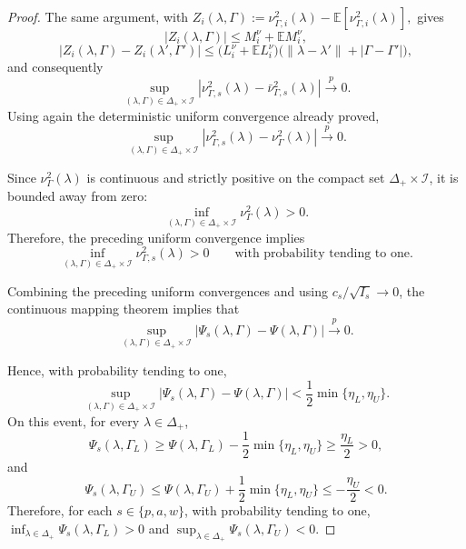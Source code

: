 \documentclass[12pt,leqno,titlepage]{amsart}
\newcommand{\1}{\mathbbm{1}}
\begin{document}
\begin{bibunit}
{\begin{proof}
The same argument, with
$
Z_i(\lambda,\Gamma):=\nu_{\Gamma,i}^2(\lambda)-\mathbb E[\nu_{\Gamma,i}^2(\lambda)],
$
gives
\[
|Z_i(\lambda,\Gamma)|\le M_i^\nu+\mathbb EM_i^\nu,
\]
\[
|Z_i(\lambda,\Gamma)-Z_i(\lambda',\Gamma')|
\le
\bigl(L_i^\nu+\mathbb EL_i^\nu\bigr)\bigl(\|\lambda-\lambda'\|+|\Gamma-\Gamma'|\bigr),
\]
and consequently
\[
\sup_{(\lambda,\Gamma)\in\Delta_+\times\mathcal I}
\left|
\nu_{\Gamma,s}^2(\lambda)-\bar\nu_{\Gamma,s}^2(\lambda)
\right|
\xrightarrow{p}0.
\]
Using again the deterministic uniform convergence already proved,
\[
\sup_{(\lambda,\Gamma)\in\Delta_+\times\mathcal I}
|\nu_{\Gamma,s}^2(\lambda)-\nu_\Gamma^2(\lambda)|
\xrightarrow{p}0.
\]

Since \(\nu_\Gamma^2(\lambda)\) is continuous and strictly positive on the compact set \(\Delta_+\times\mathcal I\), it is bounded away from zero:
\[
\inf_{(\lambda,\Gamma)\in\Delta_+\times\mathcal I}\nu_\Gamma^2(\lambda)>0.
\]
Therefore, the preceding uniform convergence implies
\[
\inf_{(\lambda,\Gamma)\in\Delta_+\times\mathcal I}\nu_{\Gamma,s}^2(\lambda)>0
\qquad\text{with probability tending to one.}
\]

Combining the preceding uniform convergences and using \(c_s/\sqrt{I_s}\to0\), the continuous mapping theorem implies that
\[
\sup_{(\lambda,\Gamma)\in\Delta_+\times\mathcal I}
|\Psi_s(\lambda,\Gamma)-\Psi(\lambda,\Gamma)|
\xrightarrow{p}0.
\]

Hence, with probability tending to one,
\[
\sup_{(\lambda,\Gamma)\in\Delta_+\times\mathcal I}
|\Psi_s(\lambda,\Gamma)-\Psi(\lambda,\Gamma)|
<
\frac12\min\{\eta_L,\eta_U\}.
\]
On this event, for every \(\lambda\in\Delta_+\),
\[
\Psi_s(\lambda,\Gamma_L)
\ge
\Psi(\lambda,\Gamma_L)-\frac12\min\{\eta_L,\eta_U\}
\ge
\frac{\eta_L}{2}>0,
\]
and
\[
\Psi_s(\lambda,\Gamma_U)
\le
\Psi(\lambda,\Gamma_U)+\frac12\min\{\eta_L,\eta_U\}
\le
-\frac{\eta_U}{2}<0.
\]
Therefore, for each \(s\in\{p,a,w\}\), with probability tending to one,
$
\inf_{\lambda\in\Delta_+}\Psi_s(\lambda,\Gamma_L)>0$ and $
\sup_{\lambda\in\Delta_+}\Psi_s(\lambda,\Gamma_U)<0.
$

\medskip




\end{proof}}
\end{bibunit}
\end{document}
